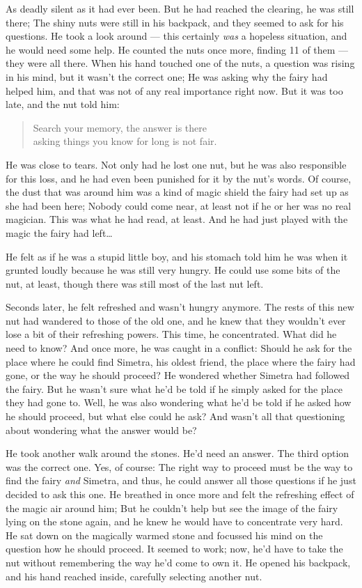 As deadly silent as it had ever been. But he had reached the clearing, he was still there; The shiny nuts were still in his backpack, and they seemed to ask for his questions. He took a look around --- this certainly \emph{was} a hopeless situation, and he would need some help. He counted the nuts once more, finding 11 of them --- they were all there. When his hand touched one of the nuts, a question was rising in his mind, but it wasn't the correct one; He was asking why the fairy had helped him, and that was not of any real importance right now. But it was too late, and the nut told him: 
\begin{quote}
Search your memory, the answer is there\\
asking things you know for long is not fair. 
\end{quote}
He was close to tears. Not only had he lost one nut, but he was also responsible for this loss, and he had even been punished for it by the nut's words. Of course, the dust that was around him was a kind of magic shield the fairy had set up as she had been here; Nobody could come near, at least not if he or her was no real magician. This was what he had read, at least. And he had just played with the magic the fairy had left\dots

He felt as if he was a stupid little boy, and his stomach told him he was when it grunted loudly because he was still very hungry. He could use some bits of the nut, at least, though there was still most of the last nut left.

Seconds later, he felt refreshed and wasn't hungry anymore. The rests of this new nut had wandered to those of the old one, and he knew that they wouldn't ever lose a bit of their refreshing powers. 
This time, he concentrated. What did he need to know? And once more, he was caught in a conflict: Should he ask for the place where he could find Simetra, his oldest friend, the place where the fairy had gone, or the way he should proceed? He wondered whether Simetra had followed the fairy. But he wasn't sure what he'd be told if he simply asked for the place they had gone to. Well, he was also wondering what he'd be told if he asked how he should proceed, but what else could he ask? And wasn't all that questioning about wondering what the answer would be?

He took another walk around the stones. He'd need an answer. The third option was the correct one. Yes, of course: The right way to proceed must be the way to find the fairy \emph{and} Simetra, and thus, he could answer all those questions if he just decided to ask this one. 
He breathed in once more and felt the refreshing effect of the magic air around him; But he couldn't help but see the image of the fairy lying on the stone again, and he knew he would have to concentrate very hard. He sat down on the magically warmed stone and focussed his mind on the question how he should proceed. It seemed to work; now, he'd have to take the nut without remembering the way he'd come to own it. He opened his backpack, and his hand reached inside, carefully selecting another nut.

